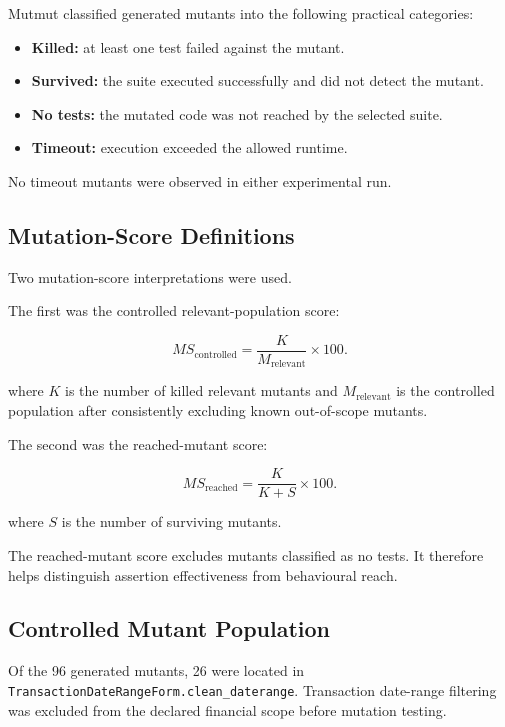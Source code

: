 \documentclass[12pt]{article}
\begin{document}
Mutmut classified generated mutants into the following practical categories:

\begin{itemize}
    \item \textbf{Killed:} at least one test failed against the mutant.
    \item \textbf{Survived:} the suite executed successfully and did not detect
          the mutant.
    \item \textbf{No tests:} the mutated code was not reached by the selected
          suite.
    \item \textbf{Timeout:} execution exceeded the allowed runtime.
\end{itemize}

No timeout mutants were observed in either experimental run.

\subsection{Mutation-Score Definitions}

Two mutation-score interpretations were used.

The first was the controlled relevant-population score:

\begin{equation}
MS_{\text{controlled}}
=
\frac{K}{M_{\text{relevant}}}
\times 100.
\end{equation}

where \(K\) is the number of killed relevant mutants and
\(M_{\text{relevant}}\) is the controlled population after consistently
excluding known out-of-scope mutants.

The second was the reached-mutant score:

\begin{equation}
MS_{\text{reached}}
=
\frac{K}{K+S}
\times 100.
\end{equation}

where \(S\) is the number of surviving mutants.

The reached-mutant score excludes mutants classified as no tests. It therefore
helps distinguish assertion effectiveness from behavioural reach.

\subsection{Controlled Mutant Population}

Of the 96 generated mutants, 26 were located in
\texttt{TransactionDateRangeForm.clean\_daterange}. Transaction date-range
filtering was excluded from the declared financial scope before mutation
testing.
\end{document}
